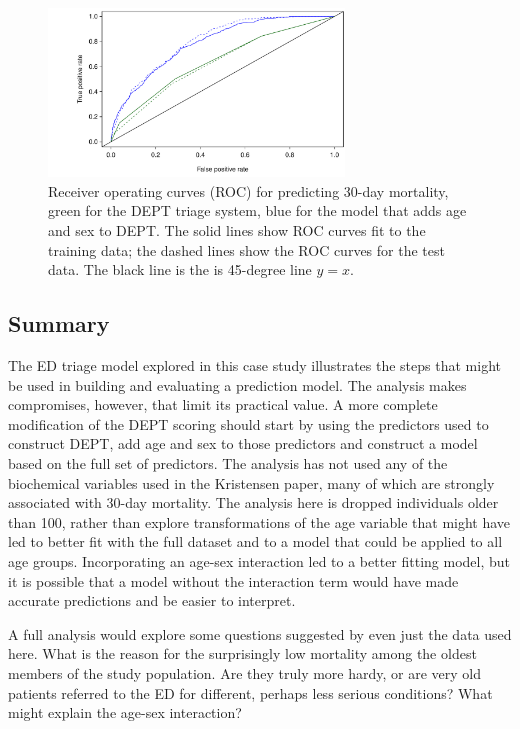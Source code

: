 \begin{figure}[!tbh]
  \centering
  \includegraphics[width=0.70\textwidth]
  {ch_logistic_regression_oi_biostat/figures/ROCDanishED/ROCDanishED.pdf}
    \caption{Receiver operating curves (ROC) for predicting 30-day mortality,  green for the DEPT triage system, blue for the model that adds age and sex to DEPT\@.  The solid lines show ROC curves fit to the training data; the dashed lines show the ROC curves for the test data.  The black line is the is 45-degree line $y = x$. }
    \label{figure:ROCDanishED}
\end{figure}

\textD{\newpage}

\subsection{Summary}
\label{section:interpretationNewColorScore}

The ED triage model explored in this case study illustrates the steps that might be used in building and evaluating a prediction model.   The analysis makes compromises, however, that limit its practical value.  A more complete modification of the DEPT scoring should start by using the predictors used to construct DEPT, add age and sex to those predictors and construct a model based on the full set of predictors.   The analysis has not used any of the biochemical variables used in the Kristensen paper, many of which are strongly associated with 30-day mortality. The analysis here is dropped individuals older than 100, rather than explore transformations of the age variable that might have led to  better fit with the full dataset and to a model that could be applied to all age groups.  Incorporating an age-sex interaction led to a better fitting model, but it is possible that a model without the interaction term would have made accurate predictions and be easier to interpret. 

A full analysis would explore some questions suggested by even just the data used here.  What is the reason for the surprisingly low mortality among the oldest members of the study population. Are they truly more hardy, or are very old patients referred to the ED for different, perhaps less serious conditions?  What might explain the age-sex interaction?

